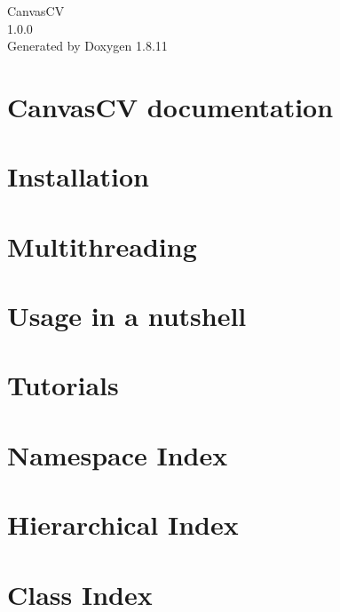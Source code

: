 \documentclass[twoside]{book}
\newcommand{\+}{\discretionary{\mbox{\scriptsize$\hookleftarrow$}}{}{}}
\newcommand{\clearemptydoublepage}{%
  \newpage{\pagestyle{empty}\cleardoublepage}%
}
\begin{document}
\hypersetup{pageanchor=false,
             bookmarksnumbered=true,
             pdfencoding=unicode
            }
\begin{titlepage}
\vspace*{7cm}
\begin{center}%
{\Large Canvas\+CV \\[1ex]\large 1.\+0.\+0 }\\
\vspace*{1cm}
{\large Generated by Doxygen 1.8.11}\\
\end{center}
\end{titlepage}
\clearemptydoublepage
\tableofcontents
\clearemptydoublepage
{}
\hypersetup{pageanchor=true}

\chapter{Canvas\+CV documentation}
\label{index}\hypertarget{index}{}
\chapter{Installation}
\label{install}
\hypertarget{install}{}

\chapter{Multithreading}
\label{multithreading}
\hypertarget{multithreading}{}

\chapter{Usage in a nutshell}
\label{nutshell}
\hypertarget{nutshell}{}

\chapter{Tutorials}
\label{tutorials}
\hypertarget{tutorials}{}

\chapter{Namespace Index}

\chapter{Hierarchical Index}

\chapter{Class Index}

\end{document}
